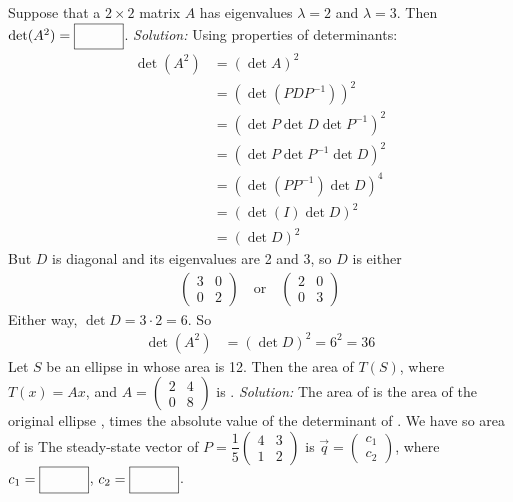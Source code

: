 \fi 
\ifnum {}
        Suppose that a $2\times 2$ matrix $A$ has eigenvalues $\lambda = 2$ and $\lambda= 3$. Then $\det(A^2) =  \framebox{\strut\hspace{1cm}}$. 
        \ifnum {} {\color{DarkBlue} \textit{Solution:} Using properties of determinants:
        \begin{align}
            \det(A^2) &= (\det A)^2 \\
            &= (\det (PDP^{-1}))^2 \\
            &= (\det P \det D \det P^{-1})^2\\
            &= (\det P  \det P^{-1} \det D)^2\\
            &= (\det (P P^{-1}) \det D)^4\\
            &= (\det (I) \det D)^2\\
            &= (\det D)^2
        \end{align}
        But $D$ is diagonal and its eigenvalues are 2 and 3, so $D$ is either 
        \begin{align}
            \begin{pmatrix} 3&0\\0&2\end{pmatrix} \quad \text{or} \quad \begin{pmatrix} 2&0\\0&3\end{pmatrix}
        \end{align}        
        Either way, $\det D = 3 \cdot 2 = 6$. So 
        \begin{align}
            \det(A^2) 
            &= (\det D)^2 = 6^2 = 36
        \end{align}        
        } \fi    
\fi 
\ifnum {} %
    Let $S$ be an ellipse in whose area is 12. Then the area of $T(S)$, where $T(x) = Ax$, and $A = \begin{pmatrix} 2&4\\0&8\end{pmatrix}$ is \framebox{\strut\hspace{1cm}}.
    \ifnum {} {\color{DarkBlue} \textit{Solution:} The area of 
 is the area of the original ellipse 
, times the absolute value of the determinant of 
. We have
so area of 
 is   } \fi    
\fi 
\ifnum {} %
    The steady-state vector of $P=\dfrac15\begin{pmatrix} 4&3\\1&2\end{pmatrix}$ is $\vec q = \begin{pmatrix} c_1 \\c_2 \end{pmatrix}$, where $c_1 = \framebox{\strut\hspace{1cm}}$, $c_2 = \framebox{\strut\hspace{1cm}}$.
        
